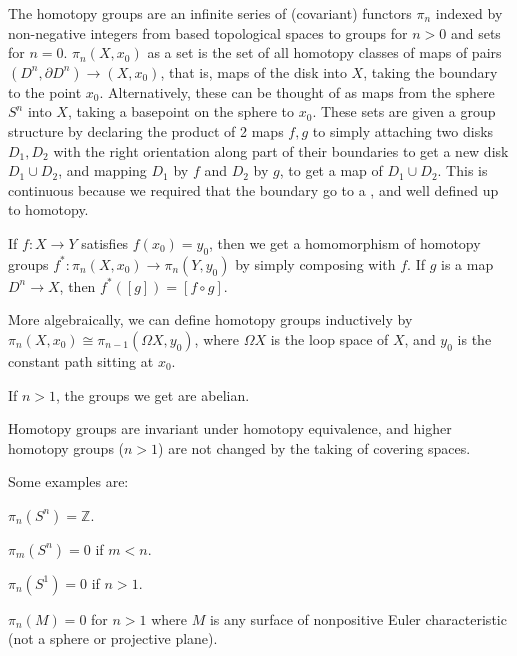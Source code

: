 \documentclass[12pt]{article}
\begin{document}
The homotopy groups are an infinite series of (covariant) functors $\pi_n$ indexed by non-negative integers from based topological spaces to groups for $n>0$ and sets for $n=0$.  $\pi_n(X,x_0)$ as a set is the set of all homotopy classes of maps of pairs $(D^n,\partial D^n)\to (X,x_0)$, that is, maps of the disk into $X$, taking the boundary to the point $x_0$.  Alternatively, these can be thought of as maps from the sphere $S^n$ into $X$, taking a basepoint on the sphere 
to $x_0$.  These sets are given a group structure by declaring the product of 2 maps $f,g$ to simply attaching two disks $D_1,D_2$ with the right orientation along part of their boundaries to get a new disk $D_1\cup D_2$, and mapping $D_1$ by $f$ and $D_2$ by $g$, to get a map of $D_1\cup D_2$.  This is continuous because we required that the boundary go to a , and well defined up to homotopy.

If $f:X\to Y$ satisfies $f(x_0)=y_0$, then we get a homomorphism of homotopy groups $f^*:\pi_n(X,x_0)\to\pi_n(Y,y_0)$ by simply composing with $f$.  If $g$ is a map $D^n\to X$,  then $f^*([g])=[f\circ g]$.

More algebraically, we can define homotopy groups inductively by 
$\pi_n(X,x_0)\cong\pi_{n-1}(\Omega X,y_0)$, where $\Omega X$ is the loop space of $X$, and $y_0$ is the constant path sitting at $x_0$.

If $n>1$, the groups we get are abelian.

Homotopy groups are invariant under homotopy equivalence, and higher homotopy groups ($n>1$) 
are not changed by the taking of covering spaces.  

Some examples are:

$\pi_n(S^n)=\mathbb{Z}$.

$\pi_m(S^n)=0$ if $m<n$.

$\pi_n(S^1)=0$ if $n>1$.

$\pi_n(M)=0$ for $n>1$ where $M$ is any surface of nonpositive Euler characteristic 
(not a sphere or projective plane).
\end{document}
